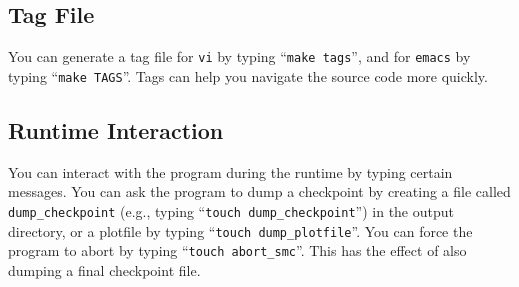 \documentclass[11pt,letterpaper]{article}
\begin{document}
\subsection{Tag File}

You can generate a tag file for {\tt vi} by typing ``{\tt make
  tags}'', and for {\tt emacs} by typing ``{\tt make TAGS}''.  Tags
can help you navigate the source code more quickly.

\subsection{Runtime Interaction}

You can interact with the program during the runtime by typing certain
messages.  You can ask the program to dump a checkpoint by creating a
file called {\tt dump\_checkpoint} (e.g., typing ``{\tt touch
  dump\_checkpoint}'') in the output directory, or a plotfile by
typing ``{\tt touch dump\_plotfile}''.  You can force the program to
abort by typing ``{\tt touch abort\_smc}''.  This has the effect of
also dumping a final checkpoint file.





\end{document}
